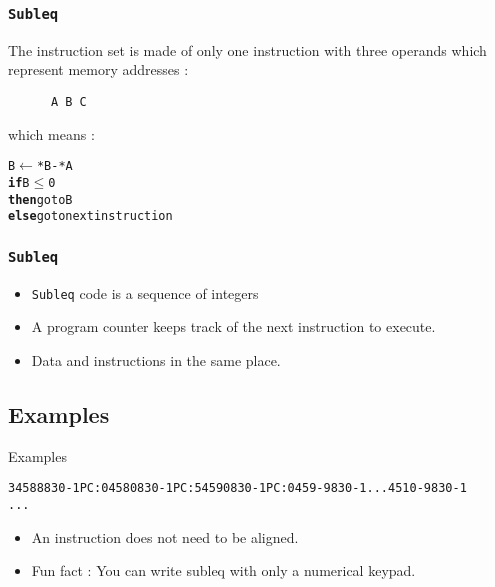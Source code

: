 \documentclass{beamer}
\begin{document}
\begin{frame}[fragile]
    \frametitle{\texttt{Subleq}}
    The instruction set is made of only one instruction with three
    operands which represent memory addresses :
    \\[11pt]
    \begin{verbatim}
      A B C
    \end{verbatim}
    \pause
    which means :

    \begin{alltt}
       B \(\leftarrow\) *B - *A
      {\bf if} B \(\leq\) 0
      {\bf then} go to B
      {\bf else} go to next instruction
    \end{alltt}
\end{frame}

\begin{frame}
  \frametitle{\texttt{Subleq}}
  \begin{itemize}
    \item \texttt{Subleq} code is a sequence of integers%
    \item<2-> A program counter keeps track of the next instruction to execute.
    \item<3-> Data and instructions in the same place.
  \end{itemize}
\end{frame}

\subsection{Examples}
\begin{frame}[fragile]{Examples}
  \begin{alltt}
  3  4  5   8  8   8  3  0  -1     PC : 0  4  5   8  0   8  3  0  -1     PC : 5  4  5   9  0   8  3  0  -1     PC : 0  4  5   9 -9   8  3  0  -1     ...  4  5  10 -9   8  3  0  -1
  ...
  \end{alltt}
  \begin{itemize}
    \item<6-> An instruction does not need to be aligned.
    \item<7-> Fun fact : You can write subleq with only a numerical keypad.
  \end{itemize}
\end{frame}
\end{document}
